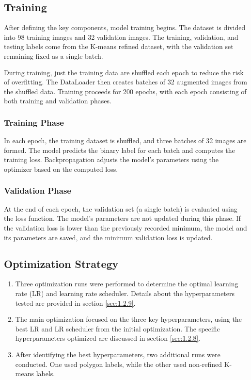 \subsection{Training}

After defining the key components, model training begins. The dataset is divided into 98 training images and 32 validation images. The training, validation, and testing labels come from the K-means refined dataset, with the validation set remaining fixed as a single batch.

During training, just the training data are shuffled each epoch to reduce the risk of overfitting. The DataLoader then creates batches of 32 augmented images from the shuffled data. Training proceeds for 200 epochs, with each epoch consisting of both training and validation phases.

\subsubsection{Training Phase}

In each epoch, the training dataset is shuffled, and three batches of 32 images are formed. The model predicts the binary label for each batch and computes the training loss. Backpropagation adjusts the model's parameters using the optimizer based on the computed loss.

\subsubsection{Validation Phase}

At the end of each epoch, the validation set (a single batch) is evaluated using the loss function. The model's parameters are not updated during this phase. If the validation loss is lower than the previously recorded minimum, the model and its parameters are saved, and the minimum validation loss is updated.

\subsection{Optimization Strategy}

\begin{enumerate}
    \item Three optimization runs were performed to determine the optimal learning rate (LR) and learning rate scheduler. Details about the hyperparameters tested are provided in section \ref{sec:1.2.9}.
    \item The main optimization focused on the three key hyperparameters, using the best LR and LR scheduler from the initial optimization. The specific hyperparameters optimized are discussed in section \ref{sec:1.2.8}.
    \item After identifying the best hyperparameters, two additional runs were conducted. One used polygon labels, while the other used non-refined K-means labels.
\end{enumerate}
